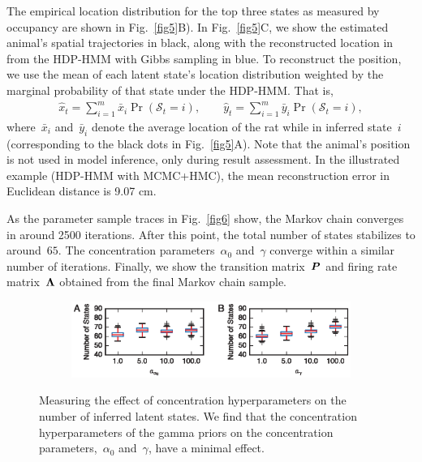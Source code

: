 The empirical location distribution for the top three states as measured by occupancy are shown in Fig.~\ref{fig5}B). In Fig.~\ref{fig5}C, we show the estimated animal's spatial trajectories in black, along with the reconstructed location in from the HDP-HMM with Gibbs sampling in blue. To reconstruct the position, we use the mean of each latent state's location distribution weighted by the marginal probability of that state under the HDP-HMM. That is,
\begin{align}
\hat{x}_t = \sum_{i=1}^m \bar{x}_i \Pr(\mathcal{S}_t=i), \qquad
\hat{y}_t = \sum_{i=1}^m  \bar{y}_i \Pr(\mathcal{S}_t=i),
\end{align}
where~$\bar{x}_i$ and~$\bar{y}_i$ denote the average location of the rat while in inferred state~$i$ (corresponding to the black dots in Fig.~\ref{fig5}A). Note that the animal's position is not used in model inference, only during result assessment. In the illustrated example (HDP-HMM with MCMC+HMC), the mean reconstruction error in Euclidean distance is 9.07 cm. 



As the parameter sample traces in Fig.~\ref{fig6} show, the Markov chain converges in around 2500 iterations. After this point, the total number of states stabilizes to around~$65$.
The concentration parameters~$\alpha_0$ and~$\gamma$ converge within a similar number of iterations.
Finally, we show the  transition matrix~$\boldsymbol{P}$ and firing rate matrix~$\boldsymbol{\Lambda}$ obtained from the final Markov chain  sample.


\begin{figure}
\centering
\begin{subfigure}[t]{5in}
\includegraphics[width=\textwidth]{figures/ch5/Fig7}
\end{subfigure}
\caption{ Measuring the effect of concentration  hyperparameters on the number of inferred latent states. We find that the concentration  hyperparameters of the gamma priors on the concentration parameters,~$\alpha_0$ and~$\gamma$, have a minimal effect.}
\label{fig7}
\end{figure}



